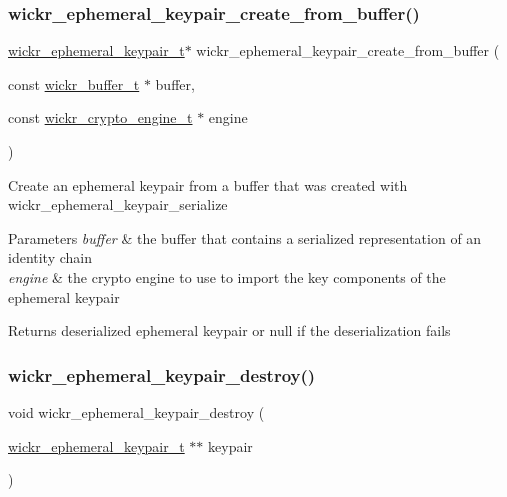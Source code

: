 \subsubsection{\texorpdfstring{wickr\_ephemeral\_keypair\_create\_from\_buffer()}{wickr\_ephemeral\_keypair\_create\_from\_buffer()}}
{\footnotesize\ttfamily \mbox{\hyperlink{structwickr__ephemeral__keypair}{wickr\+\_\+ephemeral\+\_\+keypair\+\_\+t}}$\ast$ wickr\+\_\+ephemeral\+\_\+keypair\+\_\+create\+\_\+from\+\_\+buffer (\begin{DoxyParamCaption}\item[{const \mbox{\hyperlink{structwickr__buffer}{wickr\+\_\+buffer\+\_\+t}} $\ast$}]{buffer,  }\item[{const \mbox{\hyperlink{structwickr__crypto__engine}{wickr\+\_\+crypto\+\_\+engine\+\_\+t}} $\ast$}]{engine }\end{DoxyParamCaption})}

Create an ephemeral keypair from a buffer that was created with \textquotesingle{}wickr\+\_\+ephemeral\+\_\+keypair\+\_\+serialize\textquotesingle{}


\begin{DoxyParams}{Parameters}
{\em buffer} & the buffer that contains a serialized representation of an identity chain \\
\hline
{\em engine} & the crypto engine to use to import the key components of the ephemeral keypair \\
\hline
\end{DoxyParams}
\begin{DoxyReturn}{Returns}
deserialized ephemeral keypair or null if the deserialization fails 
\end{DoxyReturn}
\mbox{\label{group__wickr__ephemeral__keypair_gab77107c0b1a0d145c606817eeecec63d}} 
\subsubsection{\texorpdfstring{wickr\_ephemeral\_keypair\_destroy()}{wickr\_ephemeral\_keypair\_destroy()}}
{\footnotesize\ttfamily void wickr\+\_\+ephemeral\+\_\+keypair\+\_\+destroy (\begin{DoxyParamCaption}\item[{\mbox{\hyperlink{structwickr__ephemeral__keypair}{wickr\+\_\+ephemeral\+\_\+keypair\+\_\+t}} $\ast$$\ast$}]{keypair }\end{DoxyParamCaption})}

